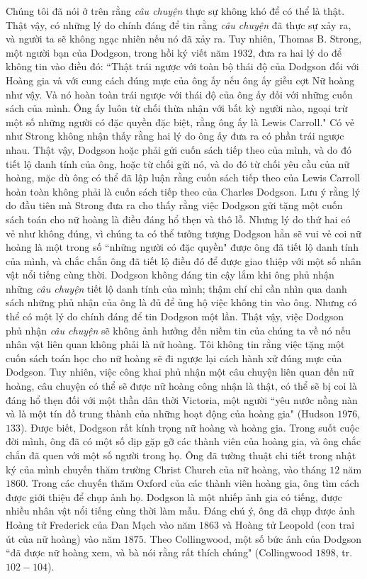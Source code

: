 \begin{multicols}{2}
	\vskip 0.1cm
	Chúng tôi đã nói ở trên rằng \textit{câu chuyện} thực sự không khó để có thể là  thật. Thật vậy, có những lý do chính đáng để tin rằng \textit{câu chuyện} đã thực sự xảy ra, và người ta sẽ không ngạc nhiên nếu nó đã xảy ra. Tuy nhiên, Thomas B. Strong, một người bạn của Dodgson, trong hồi ký viết năm $1932$, đưa ra hai lý do để không tin vào điều đó:
	\vskip 0.1cm
	``Thật trái ngược với toàn bộ thái độ của Dodgson đối với Hoàng gia và với cung cách đúng mực của ông ấy nếu  ông ấy giễu cợt Nữ hoàng như vậy. Và nó hoàn toàn trái ngược với thái độ của ông ấy đối với những cuốn sách của mình. Ông ấy luôn từ chối thừa nhận với bất kỳ người nào, ngoại trừ một số những người có đặc quyền đặc biệt, rằng ông ấy là Lewis Carroll."
	\vskip 0.1cm
	Có vẻ như Strong không nhận thấy rằng hai lý do ông ấy đưa ra có phần trái ngược nhau. Thật vậy, Dodgson hoặc phải gửi cuốn sách tiếp theo của mình, và do đó tiết lộ danh tính của ông, hoặc từ chối gửi nó, và do đó từ chối yêu cầu của nữ hoàng, mặc dù ông có thể đã  lập luận rằng cuốn sách tiếp theo của Lewis Carroll hoàn toàn không phải là cuốn sách tiếp theo của Charles Dodgson.
	\vskip 0.1cm
	Lưu ý rằng lý do đầu tiên mà Strong đưa ra cho thấy rằng việc Dodgson gửi tặng một cuốn sách toán cho nữ hoàng là điều đáng hổ thẹn và thô lỗ. Nhưng lý do thứ hai có vẻ như không đúng, vì chúng ta có thể tưởng tượng Dodgson hẳn sẽ vui vẻ coi nữ hoàng là một trong số ``những người có đặc quyền" được ông đã tiết lộ danh tính của mình, và chắc chắn ông đã tiết lộ điều đó để được giao thiệp với một số nhân vật nổi tiếng cùng thời.
	\vskip 0.1cm
	Dodgson không đáng tin cậy lắm khi ông phủ nhận những \textit{câu chuyện} tiết lộ danh tính của mình; thậm chí chỉ cần nhìn qua danh sách những phủ nhận của ông là đủ để ủng hộ việc không tin vào ông. Nhưng có thể có một lý do chính đáng để tin Dodgson một lần. Thật vậy, việc Dodgson phủ nhận \textit{câu chuyện} sẽ không ảnh hưởng đến niềm tin của chúng ta về nó nếu nhân vật liên quan không phải là nữ hoàng. Tôi không tin rằng việc tặng một cuốn sách toán học cho nữ hoàng sẽ đi ngược lại cách hành xử đúng mực của Dodgson. Tuy nhiên, việc công khai phủ nhận một câu chuyện liên quan đến nữ hoàng, câu chuyện có thể sẽ được nữ hoàng công nhận là thật, có thể sẽ bị coi là đáng hổ thẹn đối với một thần dân thời Victoria, một người ``yêu nước nồng nàn và là một tín đồ trung thành của những hoạt động của hoàng gia" (Hudson $1976$, $133$).
	\vskip 0.1cm
	Được biết, Dodgson rất kính trọng nữ hoàng và hoàng gia. Trong suốt cuộc đời mình, ông đã có một số dịp gặp gỡ các thành viên của hoàng gia, và ông chắc chắn đã quen với một số người trong họ. Ông đã tường thuật chi tiết trong nhật ký của mình chuyến thăm trường Christ Church của nữ hoàng, vào tháng $12$ năm $1860$. Trong các chuyến thăm Oxford của các thành viên hoàng gia, ông tìm cách được giới thiệu để chụp ảnh họ. Dodgson là một nhiếp ảnh gia có tiếng, được nhiều nhân vật nổi tiếng cùng thời làm mẫu. Đáng chú ý, ông đã chụp được ảnh Hoàng tử Frederick của Đan Mạch vào năm $1863$ và Hoàng tử Leopold (con trai út của nữ hoàng) vào năm $1875$. Theo Collingwood, một số bức ảnh của  Dodgson ``đã được nữ hoàng xem, và bà nói rằng rất thích chúng"  (Collingwood $1898$, tr. $102-104$).

\end{multicols}
